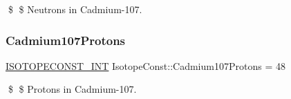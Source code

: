 \$ \$ Neutrons in Cadmium-\/107. \mbox{\label{group___isotope_const-_cadmium-_cd107_ga4f905be7c30fbb0c31247ca40a2ea65f}} 
\subsubsection{\texorpdfstring{Cadmium107\+Protons}{Cadmium107Protons}}
{\footnotesize\ttfamily \mbox{\hyperlink{group___isotope_const-_macros_ga5f18360b3e99483a35c32d789e62621c}{I\+S\+O\+T\+O\+P\+E\+C\+O\+N\+S\+T\+\_\+\+I\+NT}} Isotope\+Const\+::\+Cadmium107\+Protons = 48}

\$ \$ Protons in Cadmium-\/107. 